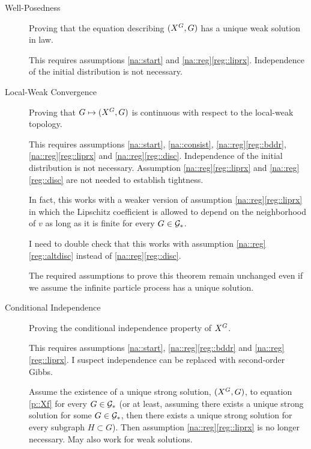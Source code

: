 \begin{description}
\item[Well-Posedness] Proving that the equation describing \((X^{G},G)\) has a unique weak solution in law.

This requires assumptions \ref{na::start} and \ref{na::reg}\ref{reg::liprx}. Independence of the initial distribution is not necessary. 

\item[Local-Weak Convergence] Proving that \(G \mapsto (X^{G},G)\) is continuous with respect to the local-weak topology.

This requires assumptions \ref{na::start}, \ref{na::consist}, \ref{na::reg}\ref{reg::bddr}, \ref{na::reg}\ref{reg::liprx} and \ref{na::reg}\ref{reg::disc}. Independence of the initial distribution is not necessary. Assumption \ref{na::reg}\ref{reg::liprx} and \ref{na::reg}\ref{reg::disc} are not needed to establish tightness.

\ind In fact, this works with a weaker version of assumption \ref{na::reg}\ref{reg::liprx} in which the Lipschitz coefficient is allowed to depend on the neighborhood of \(v\) as long as it is finite for every \(G\in \mathcal{G}_\ast\).

\ind I need to double check that this works with assumption \ref{na::reg}\ref{reg::altdisc} instead of \ref{na::reg}\ref{reg::disc}.

\ind The required assumptions to prove this theorem remain unchanged even if we assume the infinite particle process has a unique solution.

\item[Conditional Independence] Proving the conditional independence property of \(X^{G}\).

This requires assumptions \ref{na::start}, \ref{na::reg}\ref{reg::bddr} and \ref{na::reg}\ref{reg::liprx}. I suspect independence can be replaced with second-order Gibbs. 

\ind Assume the existence of a unique strong solution, \((X^{G},G)\), to equation \eqref{p::Xf} for every \(G \in \mathcal{G}_\ast\) (or at least, assuming there exists a unique strong solution for some \(G \in \mathcal{G}_\ast\), then there exists a unique strong solution for every subgraph \(H \subset G\)). Then assumption \ref{na::reg}\ref{reg::liprx} is no longer necessary. May also work for weak solutions.


\end{description}
